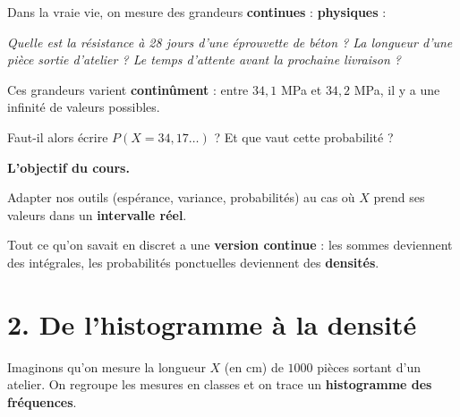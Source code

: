 \medskip

Dans la vraie vie, on mesure des grandeurs \textbf{continues} :
\textbf{physiques} :

\begin{center}
\begin{mdframed}[backgroundcolor=ThemeLight, linecolor=Theme,
  linewidth=1.5pt, innertopmargin=10pt, innerbottommargin=10pt]
\centering\large\itshape
Quelle est la résistance à 28 jours d'une éprouvette de béton ? \newline 
La longueur d'une pièce sortie d'atelier ? \newline 
Le temps d'attente avant la prochaine livraison ? \newline
\end{mdframed}
\end{center}

Ces grandeurs varient \textbf{continûment} : entre $34{,}1$ MPa
et $34{,}2$ MPa, il y a une infinité de valeurs possibles.

Faut-il alors écrire $P(X=34{,}17\ldots)$ ?
Et que vaut cette probabilité ?


\medskip

\textbf{L'objectif du cours.}

Adapter nos outils (espérance, variance, probabilités)
au cas où $X$ prend ses valeurs dans un \textbf{intervalle réel}.

Tout ce qu'on savait en discret a une \textbf{version continue} :\newline
les sommes deviennent des intégrales, \newline 
les probabilités ponctuelles
deviennent des \textbf{densités}.

\section*{2. De l'histogramme à la densité}

Imaginons qu'on mesure la longueur $X$ (en cm) de $1000$ pièces
sortant d'un atelier. On regroupe les mesures en classes et
on trace un \textbf{histogramme des fréquences}.

\medskip

